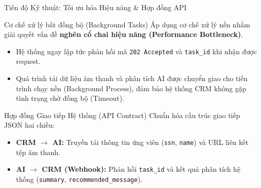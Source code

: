 \begin{frame}{Tiến độ Kỹ thuật: Tối ưu hóa Hiệu năng \& Hợp đồng API}
    \begin{block}{Cơ chế xử lý bất đồng bộ (Background Tasks)}
        Áp dụng cơ chế xử lý nền nhằm giải quyết vấn đề \textbf{nghẽn cổ chai hiệu năng (Performance Bottleneck)}. 
        \begin{itemize}
            \item Hệ thống ngay lập tức phản hồi mã \texttt{202 Accepted} và \texttt{task\_id} khi nhận được request.
            \item Quá trình tải dữ liệu âm thanh và phân tích AI được chuyển giao cho tiến trình chạy nền (Background Process), đảm bảo hệ thống CRM không gặp tình trạng chờ đồng bộ (Timeout).
        \end{itemize}
    \end{block}
    
    \begin{block}{Hợp đồng Giao tiếp Hệ thống (API Contract)}
        Chuẩn hóa cấu trúc giao tiếp JSON hai chiều:
        \begin{itemize}
            \item \textbf{CRM $\rightarrow$ AI:} Truyền tải thông tin ứng viên (\texttt{ssn}, \texttt{name}) và URL liên kết tệp âm thanh.
            \item \textbf{AI $\rightarrow$ CRM (Webhook):} Phản hồi \texttt{task\_id} và kết quả phân tích hệ thống (\texttt{summary}, \texttt{recommended\_message}).
        \end{itemize}
    \end{block}
\end{frame}

